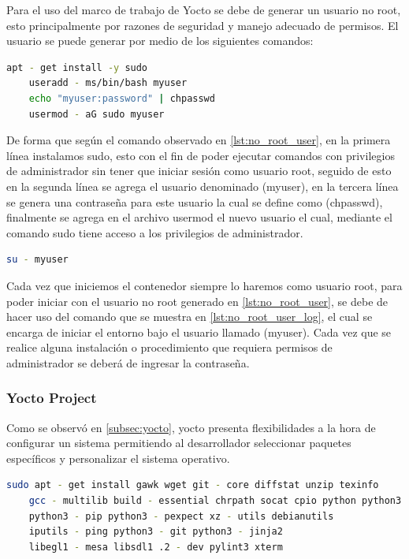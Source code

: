 Para el uso del marco de trabajo de Yocto se debe de generar un usuario no root, esto principalmente por razones de seguridad y manejo adecuado de permisos. El usuario se puede generar por medio de los siguientes comandos:

\begin{lstlisting}[language=bash, caption={Generacion de usuario no root, Linux}, label=lst:no_root_user]
    apt - get install -y sudo
    useradd - ms/bin/bash myuser
    echo "myuser:password" | chpasswd
    usermod - aG sudo myuser
\end{lstlisting}

De forma que según el comando observado en \ref{lst:no_root_user}, en la primera línea instalamos sudo, esto con el fin de poder ejecutar comandos con privilegios de administrador sin tener que iniciar sesión como usuario root, seguido de esto en la segunda línea se agrega el usuario denominado (myuser), en la tercera línea se genera una contraseña para este usuario la cual se define como (chpasswd), finalmente se agrega en el archivo usermod el nuevo usuario el cual, mediante el comando sudo tiene acceso a los privilegios de administrador. 

\begin{lstlisting}[language=bash, caption={Iniciar usuario no root, Linux}, label=lst:no_root_user_log]
    su - myuser
\end{lstlisting}

Cada vez que iniciemos el contenedor siempre lo haremos como usuario root, para poder iniciar con el usuario no root generado en \ref{lst:no_root_user}, se debe de hacer uso del comando que se muestra en \ref{lst:no_root_user_log}, el cual se encarga de iniciar el entorno bajo el usuario llamado (myuser). Cada vez que se realice alguna instalación o procedimiento que requiera permisos de administrador se deberá de ingresar la contraseña.

\subsubsection{Yocto Project}

Como se observó en \ref{subsec:yocto}, yocto presenta flexibilidades a la hora de configurar un sistema permitiendo al desarrollador seleccionar paquetes específicos y personalizar el sistema operativo.

\begin{lstlisting}[language=bash, caption={Requerimientos Yocto Zeus, Linux}, label=lst:yocto_requirements]
    sudo apt - get install gawk wget git - core diffstat unzip texinfo
    gcc - multilib build - essential chrpath socat cpio python python3
    python3 - pip python3 - pexpect xz - utils debianutils 
    iputils - ping python3 - git python3 - jinja2 
    libegl1 - mesa libsdl1 .2 - dev pylint3 xterm
\end{lstlisting}

